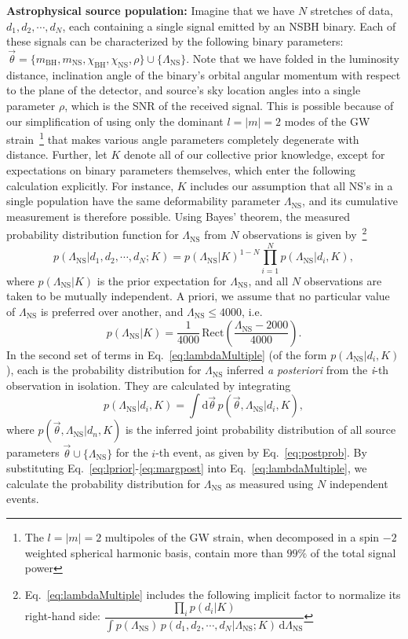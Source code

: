 \documentclass[aps,prd,amsmath,floats,floatfix, twocolumn,
superscriptaddress,nofootinbib,showpacs]{revtex4-1}
\newcommand{\D}{\mathrm{d}}
\newcommand{\lambdans}{\Lambda_\mathrm{NS}}
\newcommand{\chibh}{\chi_\mathrm{BH}}
\newcommand{\chins}{\chi_\mathrm{NS}}
\newcommand{\mbh}{m_\mathrm{BH}}
\newcommand{\mns}{m_\mathrm{NS}}
\begin{document}
\textbf{Astrophysical source population: }\label{s2:astro_multiple}
% 
Imagine that we have $N$ stretches of data, $d_1, d_2, \cdots, d_N$, each 
containing a single signal emitted by an NSBH binary. Each of these signals can
be characterized by the following binary parameters:
$\,\vec{\theta} = \{\mbh, \mns, \chibh, \chins, \rho\}\cup\{\lambdans\}$. Note
that we have folded in the luminosity distance, inclination angle of the 
binary's orbital angular momentum with respect to the plane of the detector,
and source's sky location angles into a single parameter $\rho$, which is the 
SNR of the received signal. This is possible because of our simplification of 
using only the dominant $l=|m|=2$ modes of the GW strain~\footnote{The 
$l=|m|=2$ multipoles of the GW strain, when decomposed in a spin $-2$ weighted
spherical harmonic basis, contain more than $99\%$ of the total signal power}
that makes various angle parameters completely degenerate with distance. 
Further, let $K$ denote all of our collective prior knowledge, except for 
expectations on binary parameters themselves, which enter the following 
calculation explicitly. For instance, $K$ includes our assumption that all
NS's in a single population have the same deformability parameter $\lambdans$, 
and its cumulative measurement is therefore possible.
% 
Using Bayes' theorem, the measured probability distribution function for 
$\lambdans$ from $N$ observations is given by~\footnote{%
Eq.~\ref{eq:lambdaMultiple} includes the following implicit factor to normalize
its right-hand side: $\dfrac{\prod_i p(d_i|K)}{\int p(\lambdans)\,p(d_1, d_2, \cdots, d_N | \lambdans; K)\,\D\lambdans}$}
\begin{equation}\label{eq:lambdaMultiple}
 p(\lambdans | d_1, d_2, \cdots, d_N; K) = p(\lambdans | K)^{1-N}\prod_{i=1}^N p(\lambdans | d_i, K),
\end{equation}
where $p(\lambdans|K)$ is the prior expectation for $\lambdans$, and all $N$ 
observations are taken to be mutually independent. A priori, we assume
that no particular value of $\lambdans$ is preferred over another, and 
$\lambdans\leq 4000$, i.e.
\begin{equation}\label{eq:lprior}
 p(\lambdans | K) = \dfrac{1}{4000}\,\mathrm{Rect}\left(\frac{\lambdans-2000}{4000}\right).
\end{equation}
% 
In the second set of terms in Eq.~\ref{eq:lambdaMultiple} (of the form 
$p(\lambdans | d_i, K)$), each is the probability distribution for $\lambdans$
inferred {\it a posteriori} from the \textit{i}-th observation in isolation. 
They are calculated by integrating
\begin{equation}\label{eq:margpost}
 p(\lambdans | d_i, K) = \int \D \vec{\theta}\, p(\vec{\theta}, \lambdans | d_i, K),
\end{equation}
where $p(\vec{\theta}, \lambdans | d_n, K)$ is the inferred joint probability 
distribution of all source parameters $\vec{\theta}\cup\{\lambdans\}$ for the 
$i$-th event, as given by Eq.~\ref{eq:postprob}. By substituting
Eq.~\ref{eq:lprior}-\ref{eq:margpost} into Eq.~\ref{eq:lambdaMultiple}, we
calculate the probability distribution for $\lambdans$ as measured using $N$
independent events.
\end{document}
